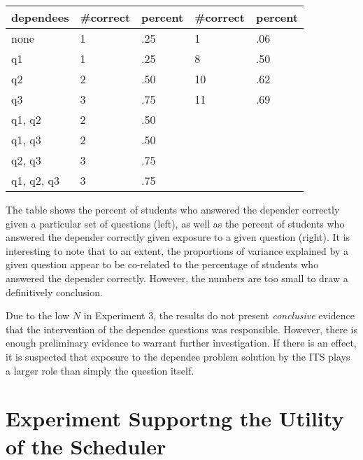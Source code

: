 \begin{center}
\begin{tabular}{|l|l|l|l|l|}
\hline
dependees    & \#correct &  percent & \#correct & percent \\ \hline
none         &  1  & .25  &1&  .06 \\ \hline
q1           &  1  & .25  &8&  .50 \\ \hline
q2           &  2  & .50  &10& .62 \\ \hline
q3           &  3  & .75  &11& .69 \\ \hline
q1, q2       &  2  & .50  && \\ \hline
q1, q3       &  2  & .50  && \\ \hline
q2, q3       &  3  & .75  && \\ \hline
q1, q2, q3   &  3  & .75  && \\ \hline
\end{tabular}
\end{center}

The table shows the percent of students who answered the depender correctly
given a particular set of questions (left), as well as the percent of students
who answered the depender correctly given exposure to a given question (right). 
It is interesting to note that to an extent, the proportions of variance
explained by a given question appear to be co-related to the percentage of
students who answered the depender correctly.  However, the numbers are too
small to draw a definitively conclusion.

Due to the low $N$ in Experiment 3, the results do not present
\emph{conclusive} evidence that the intervention of the dependee questions was
responsible.  However, there is enough preliminary evidence to warrant further
investigation.  If there is an effect, it is suspected that exposure to the
dependee problem solution by the ITS plays a larger role than simply the
question itself.


\section{Experiment Supportng the Utility of the Scheduler}
